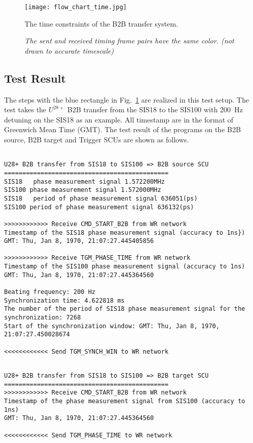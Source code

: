 \begin{landscape}
\begin{figure}[!htb]
   \centering   
   \texttt{[image: flow\_chart\_time.jpg]}
   \caption{The time constraints of the B2B transfer system.}
   \caption*{\textsl{\small{The sent and received timing frame pairs have the same color. (not drawn to accurate timescale) }}}
   \label{time_constraint}
\end{figure}
\end{landscape}

\subsection{Test Result}
The steps with the blue rectangle in Fig.~\ref{time_constraint} are realized in this test setup. The test takes the $U^{28+}$ B2B transfer from the SIS18 to the SIS100 with \SI{200}{Hz} detuning on the SIS18 as an example. All timestamp are in the format of Greenwich Mean Time (GMT).  The test result of the programs on the B2B source, B2B target and Trigger SCUs are shown as follows. 

\begin{lstlisting}[language={[ANSI]C}, keywordstyle=\color{blue!70}, commentstyle=\color{red!50!green!50!blue!50}, frame=shadowbox, rulesepcolor=\color{red!20!green!20!blue!20}]

U28+ B2B transfer from SIS18 to SIS100 => B2B source SCU
=============================================
SIS18 	phase measurement signal 1.572200MHz
SIS100 phase measurement signal 1.572000MHz 
SIS18 	period of phase measurement signal 636051(ps)
SIS100 period of phase measurement signal 636132(ps)

>>>>>>>>>>>> Receive CMD_START_B2B from WR network
Timestamp of the SIS18 phase measurement signal (accuracy to 1ns})
GMT: Thu, Jan 8, 1970, 21:07:27.445405856

>>>>>>>>>>>> Receive TGM_PHASE_TIME from WR network
Timestamp of the SIS100 phase measurement signal (accuracy to 1ns)
GMT: Thu, Jan 8, 1970, 21:07:27.445364560

Beating frequency: 200 Hz 
Synchronization time: 4.622818 ms
The number of the period of SIS18 phase measurement signal for the synchronization: 7268
Start of the synchronization window: GMT: Thu, Jan 8, 1970, 21:07:27.450028674

<<<<<<<<<<<< Send TGM_SYNCH_WIN to WR network
\end{lstlisting}

\begin{lstlisting}[language={[ANSI]C}, keywordstyle=\color{blue!70}, commentstyle=\color{red!50!green!50!blue!50}, frame=shadowbox, rulesepcolor=\color{red!20!green!20!blue!20}]

U28+ B2B transfer from SIS18 to SIS100 => B2B target SCU
=============================================
>>>>>>>>>>>> Receive CMD_START_B2B from WR network
Timestamp of the phase measurement signal from SIS100 (accuracy to 1ns)
GMT: Thu, Jan 8, 1970, 21:07:27.445364560

<<<<<<<<<<<< Send TGM_PHASE_TIME to WR network
\end{lstlisting}

